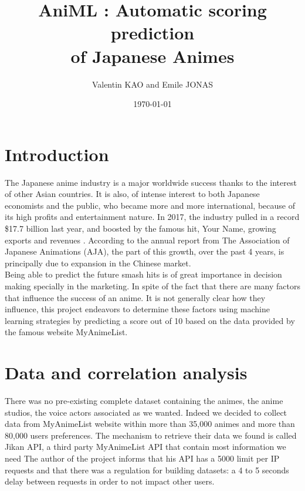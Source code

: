 \documentclass[final]{beamer}
\title
[Final Presentation for ML Course, June 2018, Beijing]
{ %
AniML : Automatic scoring prediction \\
of Japanese Animes
}
\author{
Valentin KAO and Emile JONAS
}
\institute{Department of Computer Sciences\\
Tsinghua University\\
}
\date{\today}
\begin{document}
\begin{frame}[t]
\begin{multicols}{3}

\section{Introduction}
The Japanese anime industry is a major worldwide success thanks to the interest of other Asian countries. It is also, of intense interest to both Japanese economists and the public, who became more and more international, because of its high profits and entertainment nature. In 2017, the industry pulled in a record \$17.7 billion last year, and boosted by the famous hit, Your Name, growing exports and revenues \cite{web1}. According to the annual report from The Association of Japanese Animations (AJA),  the part of this growth, over the past 4 years, is principally due to expansion in the Chinese market. \\
Being able to predict the future smash hits is of great importance in decision making specially in the marketing. In spite of the fact that there are many factors that influence the success of an anime. It is not generally clear how they influence, this project endeavors to determine these factors using machine learning strategies by predicting a score out of 10 based on the data provided by the famous website MyAnimeList. \\




\section{Data and correlation analysis}
There was no pre-existing complete dataset containing the animes, the anime studios, the voice actors associated as we wanted.
Indeed we decided to collect data from MyAnimeList website within more than 35,000 animes and more than 80,000 users preferences.
The mechanism to retrieve their data we found is called Jikan API, a third party MyAnimeList API that contain most information we
need The author of the project informs that his API has a 5000 limit per IP requests and that there was a regulation for building datasets:
a 4 to 5 seconds delay between requests in order to not impact other users.


\end{multicols}
\end{frame}
\end{document}

